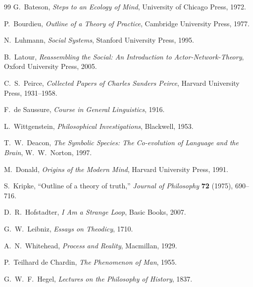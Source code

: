 \documentclass[11pt]{article}
\theoremstyle{remark}
\theoremstyle{plain}
\begin{document}
\begin{thebibliography}{99}
G.\ Bateson,
\emph{Steps to an Ecology of Mind},
University of Chicago Press, 1972.

P.\ Bourdieu,
\emph{Outline of a Theory of Practice},
Cambridge University Press, 1977.

N.\ Luhmann,
\emph{Social Systems},
Stanford University Press, 1995.

B.\ Latour,
\emph{Reassembling the Social: An Introduction to Actor-Network-Theory},
Oxford University Press, 2005.

C.\ S.\ Peirce,
\emph{Collected Papers of Charles Sanders Peirce},
Harvard University Press, 1931--1958.

F.\ de Saussure,
\emph{Course in General Linguistics},
1916.

L.\ Wittgenstein,
\emph{Philosophical Investigations},
Blackwell, 1953.

T.\ W.\ Deacon,
\emph{The Symbolic Species: The Co-evolution of Language and the Brain},
W.\ W.\ Norton, 1997.

M.\ Donald,
\emph{Origins of the Modern Mind},
Harvard University Press, 1991.

S.\ Kripke,
``Outline of a theory of truth,''
\emph{Journal of Philosophy} \textbf{72} (1975), 690--716.

D.\ R.\ Hofstadter,
\emph{I Am a Strange Loop},
Basic Books, 2007.

G.\ W.\ Leibniz,
\emph{Essays on Theodicy},
1710.

A.\ N.\ Whitehead,
\emph{Process and Reality},
Macmillan, 1929.

P.\ Teilhard de Chardin,
\emph{The Phenomenon of Man},
1955.

G.\ W.\ F.\ Hegel,
\emph{Lectures on the Philosophy of History},
1837.

\end{thebibliography}
\end{document}
